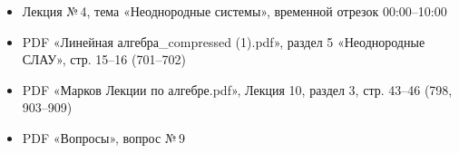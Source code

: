 \begin{tcolorbox}[title=Источники, colback=gray!10]
\begin{itemize}
  \item Лекция №\,4, тема «Неоднородные системы», временной отрезок 00:00--10:00
  \item PDF «Линейная алгебра\_compressed (1).pdf», раздел 5 «Неоднородные СЛАУ», стр. 15--16 (701--702)
  \item PDF «Марков Лекции по алгебре.pdf», Лекция 10, раздел 3, стр. 43--46 (798, 903--909)
  \item PDF «Вопросы», вопрос №\,9
\end{itemize}
\end{tcolorbox}
